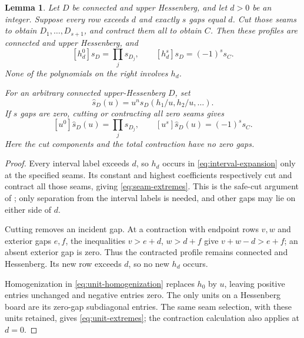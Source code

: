 \documentclass[11pt,a4paper]{amsart}
\numberwithin{equation}{section}
\theoremstyle{plain}
\newtheorem{lemma}[theorem]{Lemma}
\theoremstyle{definition}
\begin{document}
\begin{lemma}\label{lem:seam-coefficients}
Let \(D\) be connected and upper Hessenberg, and let \(d>0\) be an
integer.  Suppose every row exceeds \(d\) and exactly \(s\) gaps equal
\(d\).  Cut those seams to obtain \(D_1,\ldots,D_{s+1}\), and
contract them all to obtain \(C\).  Then these profiles are connected
and upper Hessenberg, and
\begin{equation}\label{eq:seam-extremes}
 [h_d^0]s_D=\prod_j s_{D_j},\qquad
 [h_d^s]s_D=(-1)^s s_C.
\end{equation}
None of the polynomials on the right involves \(h_d\).

For an arbitrary connected upper-Hessenberg \(D\), set
\begin{equation}\label{eq:unit-homogenization}
 \widehat s_D(u)=u^n s_D(h_1/u,h_2/u,\ldots).
\end{equation}
If \(s\) gaps are zero, cutting or contracting all zero seams gives
\begin{equation}\label{eq:unit-extremes}
 [u^0]\widehat s_D(u)=\prod_j s_{D_j},\qquad
 [u^s]\widehat s_D(u)=(-1)^s s_C.
\end{equation}
Here the cut components and the total contraction have no zero gaps.
\end{lemma}

\begin{proof}
Every interval label exceeds \(d\), so \(h_d\) occurs in
\eqref{eq:interval-expansion} only at the specified seams.  Its constant
and highest coefficients respectively cut and contract all those seams,
giving \eqref{eq:seam-extremes}.  This is the safe-cut argument of
\cite{Shields2026NegativeCount}; only separation from the interval labels
is needed, and other gaps may lie on either side of \(d\).

Cutting removes an incident gap.  At a contraction with endpoint rows
\(v,w\) and exterior gaps \(e,f\), the inequalities
\(v>e+d\), \(w>d+f\) give \(v+w-d>e+f\); an absent exterior
gap is zero.  Thus the contracted profile remains connected and
Hessenberg.  Its new row exceeds \(d\), so no new \(h_d\) occurs.

Homogenization in \eqref{eq:unit-homogenization} replaces \(h_0\)
by \(u\), leaving positive entries unchanged and negative entries zero.
The only units on a Hessenberg board are its zero-gap subdiagonal
entries.  The same seam selection, with these units retained, gives
\eqref{eq:unit-extremes}; the contraction calculation also applies at \(d=0\).
\end{proof}
\end{document}
